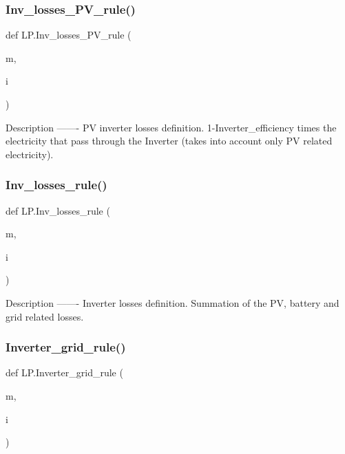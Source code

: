 \subsubsection{\texorpdfstring{Inv\+\_\+losses\+\_\+\+P\+V\+\_\+rule()}{Inv\_losses\_PV\_rule()}}
{\footnotesize\ttfamily def L\+P.\+Inv\+\_\+losses\+\_\+\+P\+V\+\_\+rule (\begin{DoxyParamCaption}\item[{}]{m,  }\item[{}]{i }\end{DoxyParamCaption})}

\begin{DoxyVerb}Description
-------
PV inverter losses definition. 1-Inverter_efficiency times the electricity that pass through the Inverter (takes into account only PV related electricity).
\end{DoxyVerb}
 \mbox{\label{namespace_l_p_a8e04fc6d66eb06e7b8673fc28098b0bb}} 
\subsubsection{\texorpdfstring{Inv\+\_\+losses\+\_\+rule()}{Inv\_losses\_rule()}}
{\footnotesize\ttfamily def L\+P.\+Inv\+\_\+losses\+\_\+rule (\begin{DoxyParamCaption}\item[{}]{m,  }\item[{}]{i }\end{DoxyParamCaption})}

\begin{DoxyVerb}Description
-------
Inverter losses definition. Summation of the PV, battery and grid related losses.
\end{DoxyVerb}
 \mbox{\label{namespace_l_p_a8faf34cc39e6767513fc5a8957d2611f}} 
\subsubsection{\texorpdfstring{Inverter\+\_\+grid\+\_\+rule()}{Inverter\_grid\_rule()}}
{\footnotesize\ttfamily def L\+P.\+Inverter\+\_\+grid\+\_\+rule (\begin{DoxyParamCaption}\item[{}]{m,  }\item[{}]{i }\end{DoxyParamCaption})}

